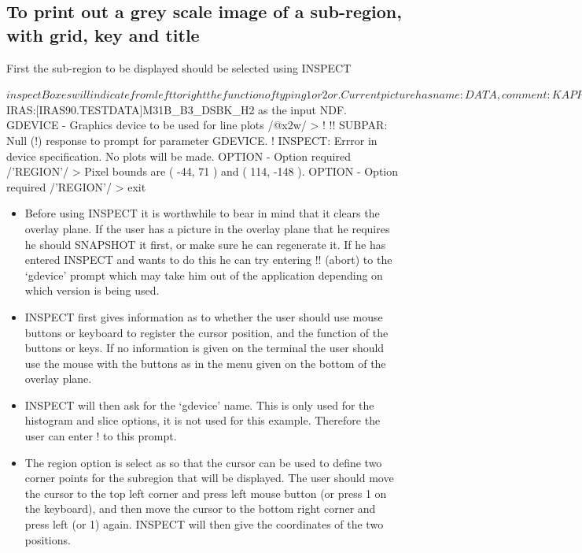 \documentclass[twoside,11pt]{starlink}
\begin{document}
\subsection{To print out a grey scale image of a sub-region, with grid, key
and title}
\label{k:greysub}
First the sub-region to be displayed should be selected using INSPECT
\begin{small}
\begin{terminalv}
$ inspect

Boxes will indicate from left to right the function of typing 1 or 2 or .

Current picture has name: DATA, comment: KAPPA_DISPLAY.
Using DISK$IRAS:[IRAS90.TESTDATA]M31B_B3_DSBK_H2 as the input NDF.
GDEVICE - Graphics device to be used for line plots /@x2w/ > !
!! SUBPAR: Null (!) response to prompt for parameter GDEVICE.
!  INSPECT: Errror in device specification.
No plots will be made.
OPTION - Option required /'REGION'/ >
Pixel bounds are ( -44, 71 ) and ( 114, -148 ).
OPTION - Option required /'REGION'/ > exit
\end{terminalv}
\end{small}
\begin{itemize}
\item Before using INSPECT it is worthwhile to bear in mind that it clears the
overlay plane. If the user has a picture in the overlay plane that he requires
he should SNAPSHOT it first, or make sure he can regenerate it.
If he has entered INSPECT and wants to do this he can try entering !! (abort)
to the `gdevice' prompt which may take him out of the application depending on
which version is being used.
\item INSPECT first gives information as to whether the user should use mouse
buttons or keyboard to register the cursor position, and the function of the
buttons or keys. If no information is given on the terminal the user should use
the mouse with the buttons as in the menu given on the bottom of the overlay
plane.
\item INSPECT will then ask for the `gdevice' name. This is only used for the
histogram and slice options, it is not used for this example. Therefore the user
can enter ! to this prompt.
\item The region option is select as so that the cursor can be used to define
two corner points for the subregion that will be displayed. The user should
move the cursor to the top left corner and press left mouse button (or press 1
on the keyboard), and then move the cursor to the bottom right corner and press
left (or 1) again. INSPECT will then give the coordinates of the two positions.
\end{itemize}
\end{document}
